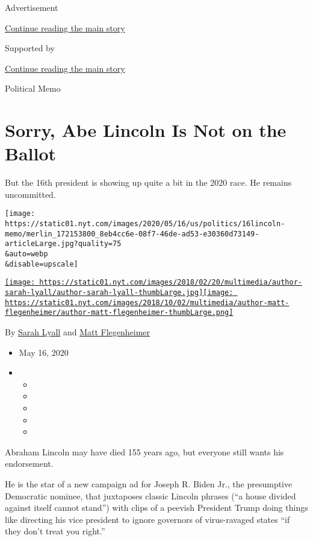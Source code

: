 Advertisement

\protect\hyperlink{after-top}{Continue reading the main story}

Supported by

\protect\hyperlink{after-sponsor}{Continue reading the main story}

Political Memo

\hypertarget{sorry-abe-lincoln-is-not-on-the-ballot}{%
\section{Sorry, Abe Lincoln Is Not on the
Ballot}\label{sorry-abe-lincoln-is-not-on-the-ballot}}

But the 16th president is showing up quite a bit in the 2020 race. He
remains uncommitted.

\texttt{[image: https://static01.nyt.com/images/2020/05/16/us/politics/16lincoln-memo/merlin\_172153800\_8eb4cc6e-08f7-46de-ad53-e30360d73149-articleLarge.jpg?quality=75\\\&auto=webp\\\&disable=upscale]}

\href{https://www.nytimes.com/by/sarah-lyall}{\texttt{[image: https://static01.nyt.com/images/2018/02/20/multimedia/author-sarah-lyall/author-sarah-lyall-thumbLarge.jpg]}}\href{https://www.nytimes.com/by/matt-flegenheimer}{\texttt{[image: https://static01.nyt.com/images/2018/10/02/multimedia/author-matt-flegenheimer/author-matt-flegenheimer-thumbLarge.png]}}

By \href{https://www.nytimes.com/by/sarah-lyall}{Sarah Lyall} and
\href{https://www.nytimes.com/by/matt-flegenheimer}{Matt Flegenheimer}

\begin{itemize}
\item
  May 16, 2020
\item
  \begin{itemize}
  \item
  \item
  \item
  \item
  \item
  \end{itemize}
\end{itemize}

Abraham Lincoln may have died 155 years ago, but everyone still wants
his endorsement.

He is the star of a new campaign ad for Joseph R. Biden Jr., the
presumptive Democratic nominee, that juxtaposes classic Lincoln phrases
(``a house divided against itself cannot stand'') with clips of a
peevish President Trump doing things like directing his vice president
to ignore governors of virus-ravaged states ``if they don't treat you
right.''

